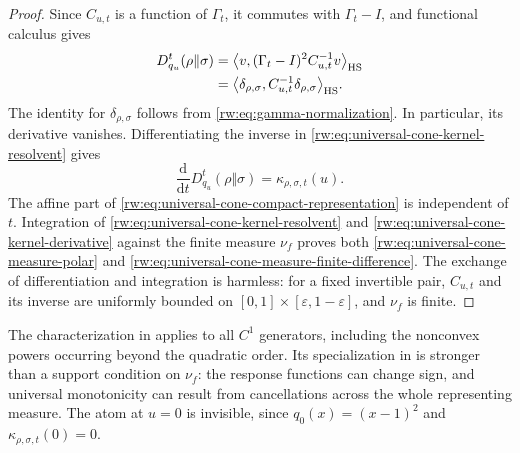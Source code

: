 \documentclass[11pt]{article}
\theoremstyle{remark}
\newcommand{\1}{\mathbbm{1}}
\begin{document}
\begin{proof}
Since \(C_{u,t}\) is a function of \(\Gamma_t\), it commutes with
\(\Gamma_t-I\), and functional calculus gives
\begin{equation}
 \begin{split}
 D_{q_u}^t(\rho\Vert\sigma)
 &=\big\langle v,
 (\Gamma_t-I)^2C_{u,t}^{-1}v\big\rangle_{\rm HS}\\
 &=\big\langle\delta_{\rho,\sigma},
 C_{u,t}^{-1}\delta_{\rho,\sigma}\big\rangle_{\rm HS}.
 \end{split}
 \label{rw:eq:universal-cone-kernel-resolvent}
\end{equation}
The identity for \(\delta_{\rho,\sigma}\) follows from
\eqref{rw:eq:gamma-normalization}.  In particular, its derivative
vanishes.  Differentiating the inverse in
\eqref{rw:eq:universal-cone-kernel-resolvent} gives
\begin{equation}
 \frac{\mathrm d}{\mathrm dt}D_{q_u}^t(\rho\Vert\sigma)
 =\kappa_{\rho,\sigma,t}(u).
 \label{rw:eq:universal-cone-kernel-derivative}
\end{equation}
The affine part of
\eqref{rw:eq:universal-cone-compact-representation} is independent of
\(t\).  Integration of
\eqref{rw:eq:universal-cone-kernel-resolvent} and
\eqref{rw:eq:universal-cone-kernel-derivative} against the finite
measure \(\nu_f\) proves both
\eqref{rw:eq:universal-cone-measure-polar} and
\eqref{rw:eq:universal-cone-measure-finite-difference}.  The exchange
of differentiation and integration is harmless: for a fixed invertible
pair, \(C_{u,t}\) and its inverse are uniformly bounded on
\([0,1]\times[\varepsilon,1-\varepsilon]\), and \(\nu_f\) is finite.
\end{proof}

The characterization in
 applies to all
\(C^1\) generators, including the nonconvex powers occurring beyond
the quadratic order.  Its specialization in
 is stronger than
a support condition on \(\nu_f\): the response functions can change
sign, and universal monotonicity can result from cancellations across
the whole representing measure.  The atom at \(u=0\) is invisible,
since \(q_0(x)=(x-1)^2\) and
\(\kappa_{\rho,\sigma,t}(0)=0\).
\end{document}
